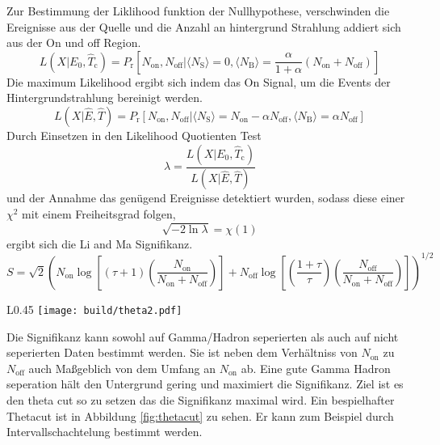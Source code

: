 Zur Bestimmung der Liklihood funktion der Nullhypothese, verschwinden die
Ereignisse aus der Quelle und die Anzahl an hintergrund Strahlung addiert sich
aus der On und off Region. 
\begin{equation}
	L(X|E_0, \hat{T}_\text{c})= P_\text{r} \left[ 
		N_\text{on}, N_\text{off} |
		\langle N_\text{S} \rangle = 0,
		\langle N_\text{B} \rangle = \frac{\alpha}{1 + \alpha} (N_\text{on} +
			N_\text{off})
	\right]
\end{equation}
Die maximum Likelihood ergibt sich indem das On Signal,
um die Events der Hintergrundstrahlung bereinigt werden.
\begin{equation}
	L(X|\hat{E}, \hat{T})= P_\text{r} \left[ 
		N_\text{on}, N_\text{off} |
		\langle N_\text{S} \rangle = N_\text{on} - \alpha N_\text{off},
		\langle N_\text{B} \rangle = \alpha N_\text{off}
	\right]
\end{equation}
Durch Einsetzen in den Likelihood Quotienten Test
\begin{equation}
	\lambda = \frac{L(X|E_0, \hat{T}_\text{c})}{L(X|\hat{E}, \hat{T})}
\end{equation}
und der Annahme das genügend Ereignisse detektiert wurden, sodass diese einer
$\chi^2$ mit einem Freiheitsgrad folgen, 
\begin{equation}
	\sqrt{- 2 \ln \lambda} = \chi(1)
\end{equation}
ergibt sich die Li and Ma Signifikanz.
\begin{equation}
	S = \sqrt{2} \left(
		N_\text{on} \log \left[
			(\tau + 1) \left( 
				\frac{N_\text{on}}{N_\text{on} + N_\text{off}} 
			\right)
		\right]  
		+ N_\text{off} \log \left[
			\left( \frac{1 + \tau}{\tau} \right) \left( 
				\frac{N_\text{off}}{N_\text{on} + N_\text{off}} 
			\right)
		\right]  
	\right) ^ {1/2}
\end{equation}

\begin{wrapfigure}[10]{L}{0.45\textwidth}
		\centering
		\texttt{[image: build/theta2.pdf]}
		\caption{Theta2 cut auf Daten zur Maximierung der Signifikanz.}
		\label{fig:thetacut}
\end{wrapfigure}
Die Signifikanz kann sowohl auf Gamma/Hadron seperierten als auch auf nicht
seperierten Daten bestimmt werden. 
Sie ist neben dem Verhältniss von $N_\text{on}$ zu $N_\text{off}$ auch
Maßgeblich von dem Umfang an $N_\text{on}$ ab.
Eine gute Gamma Hadron seperation hält den Untergrund gering und maximiert die
Signifikanz. 
Ziel ist es den theta cut so zu setzen das die Signifikanz maximal wird. 
Ein bespielhafter Thetacut ist in Abbildung \ref{fig:thetacut} zu sehen.
Er kann zum Beispiel durch Intervallschachtelung bestimmt werden.


